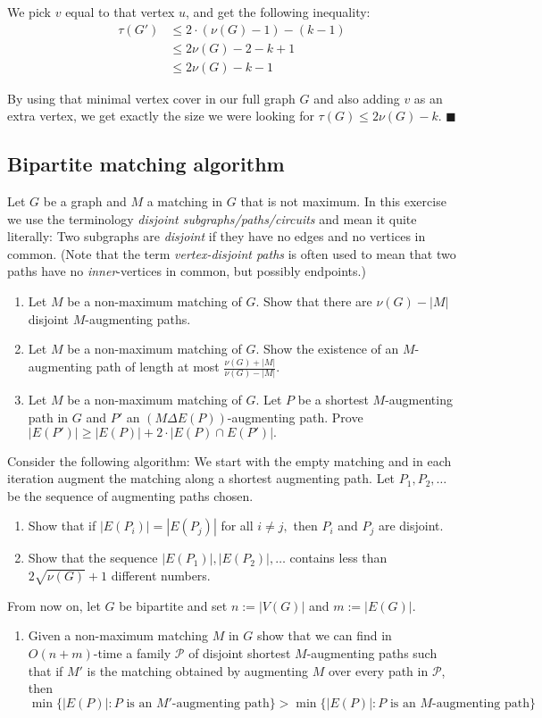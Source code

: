 \documentclass{article}
\begin{document}
  We pick $v$ equal to that vertex $u$, and get the following inequality:
  \begin{align*}
    \tau(G') &\leq 2 \cdot (\nu(G) - 1) - (k - 1)\\
    &\leq 2\nu(G) - 2 - k + 1 \\
    &\leq 2\nu(G) - k - 1
  \end{align*}

  By using that minimal vertex cover in our full graph $G$ and also adding $v$ as an extra vertex,
  we get exactly the size we were looking for $\tau(G) \leq 2\nu(G) - k$.
  $\blacksquare$
  \subsection{Bipartite matching algorithm}
  \begin{centerframebox}
    Let $G$ be a graph and $M$ a matching in $G$ that is not maximum. In this exercise we use the terminology \textit{disjoint subgraphs/paths/circuits} and mean it quite literally:
    Two subgraphs are \textit{disjoint} if they have no edges and no vertices in common.
    (Note that the term \textit{vertex-disjoint paths} is often used to mean that
    two paths have no \textit{inner}-vertices in common, but possibly endpoints.)
    \begin{enumerate}
      \item Let $M$ be a non-maximum matching of $G.$ Show that there are $\nu(G)-|M|$ disjoint $M$-augmenting paths.
      \item Let $M$ be a non-maximum matching of $G.$ Show the existence of an $M$-augmenting path of length at most $\frac{\nu(G)+|M|}{\nu(G)-|M|}.$
      \item Let $M$ be a non-maximum matching of $G.$ Let $P$ be a shortest $M$-augmenting path in $G$ and $P'$ an $(M\Delta E(P))$-augmenting path. Prove $|E(P')|\geq |E(P)|+2\cdot |E(P)\cap E(P')|.$
    \end{enumerate}
    Consider the following algorithm: We start with the empty matching and in each iteration augment the matching along a shortest augmenting path. Let $P_1,P_2,\dots$ be the sequence of augmenting paths chosen.
    \begin{enumerate}[resume]
      \item Show that if $|E(P_i)|=|E(P_j)|$ for all $i\neq j,$ then $P_i$ and $P_j$ are disjoint.
      \item Show that the sequence $|E(P_1)|,|E(P_2)|,\dots$ contains less than $2\sqrt{\nu(G)}+1$ different numbers.
    \end{enumerate}
    From now on, let $G$ be bipartite and set $n := |V (G)|$ and $m := |E(G)|$.
    \begin{enumerate}[resume]
      \item Given a non-maximum matching $M$ in $G$ show that we can find in $O(n+m)$-time a family $\mathcal{P}$ of disjoint shortest $M$-augmenting paths such that if $M'$ is the matching obtained by augmenting $M$ over every path in $\mathcal{P}$, then
      $$ \min\{|E(P)| : P\textrm{ is an }M'\textrm{-augmenting path}\} > \min\{|E(P)| : P\textrm{ is an }M\textrm{-augmenting path}\} $$


\end{enumerate}
\end{centerframebox}
\end{document}

